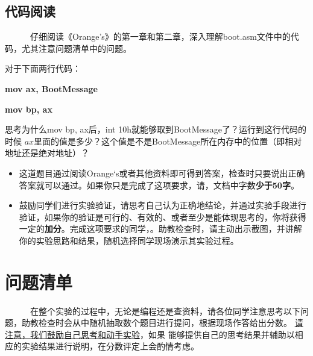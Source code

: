 \documentclass[a4paper]{article}
\begin{document}
\subsection{代码阅读}
~~~~~~仔细阅读《Orange's》的第一章和第二章，深入理解boot.asm文件中的代码，尤其注意问题清单中的问题。

对于下面两行代码：

	 \textbf{mov ax, BootMessage}
	
	\textbf{mov bp, ax}
		
	思考为什么mov bp, ax后，int 10h就能够取到BootMessage了？运行到这行代码的时候
	$ax$里面的值是多少？这个值是不是BootMessage所在内存中的位置（即相对地址还是绝对地址）？
	\begin{itemize}
		\item 这道题目通过阅读Orange‘s或者其他资料即可得到答案，检查时只要说出正确答案就可以通过。如果你只是完成了这项要求，请\underline{}，文档中字数\textbf{少于50字}。
		\item 鼓励同学们进行实验验证，请思考自己认为正确地结论，并通过实验手段进行验证，如果你的验证是可行的、有效的、或者至少是能体现思考的，你将获得一定的\textbf{加分}。完成这项要求的同学，\underline{}。助教检查时，请主动出示截图，并讲解你的实验思路和结果，随机选择同学现场演示其实验过程。
	\end{itemize}


\section{问题清单}
~~~~~~在整个实验的过程中，无论是编程还是查资料，请各位同学注意思考以下问题，助教检查时会从中随机抽取数个题目进行提问，根据现场作答给出分数。
\underline{请注意，我们鼓励自己思考和动手实验}，如果
能够提供自己的思考结果并辅助以相应的实验结果进行说明，在分数评定上会酌情考虑。
\end{document}
